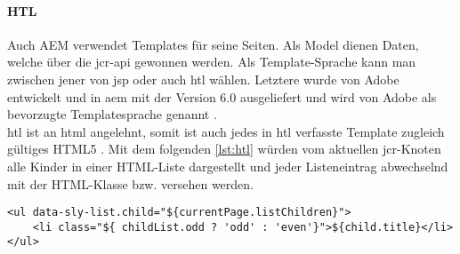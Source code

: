 \paragraph{HTL}
\label{sec:htl}
Auch AEM verwendet Templates für seine Seiten. Als Model dienen Daten, welche über die \ac{jcr}-\ac{api} gewonnen werden. Als Template-Sprache kann man zwischen jener von \ac{jsp} oder auch \ac{htl} wählen. Letztere wurde von Adobe entwickelt und in \ac{aem} mit der Version 6.0 ausgeliefert und wird von Adobe als bevorzugte Templatesprache genannt \cite{Adobe2016}. \\
\ac{htl} ist an \ac{html} angelehnt, somit ist auch jedes in \ac{htl} verfasste Template zugleich gültiges HTML5 \cite[S. 5.11 f.]{Incorporated2015}. Mit dem folgenden \autoref{lst:htl} würden vom aktuellen \ac{jcr}-Knoten alle Kinder in einer HTML-Liste dargestellt und jeder Listeneintrag abwechselnd mit der HTML-Klasse  bzw.  versehen werden.


\begin{lstlisting}[style=htmlcssjs, caption=Ein HTL Beispiel, label=lst:htl]
<ul data-sly-list.child="${currentPage.listChildren}">
	<li class="${ childList.odd ? 'odd' : 'even'}">${child.title}</li>
</ul>
\end{lstlisting}